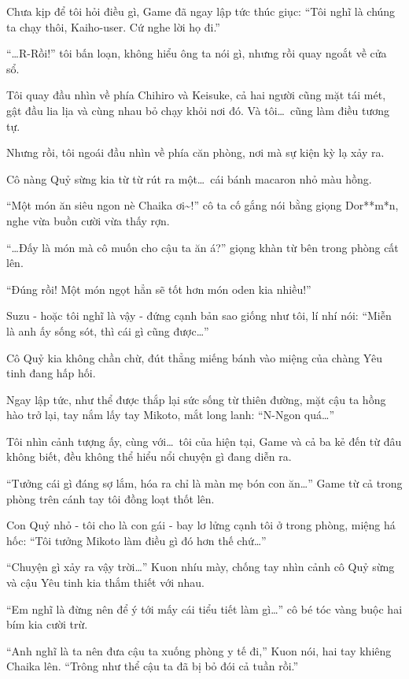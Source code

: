 \documentclass[../main.tex]{subfiles}
\begin{document}
Chưa kịp để tôi hỏi điều gì, Game đã ngay lập tức thúc giục: ``Tôi nghĩ là chúng ta chạy thôi, Kaiho-user. Cứ nghe lời họ đi.''

``\dots R-Rồi!'' tôi bấn loạn, không hiểu ông ta nói gì, nhưng rồi quay ngoắt về cửa sổ.

Tôi quay đầu nhìn về phía Chihiro và Keisuke, cả hai người cũng mặt tái mét, gật đầu lia lịa và cùng nhau bỏ chạy khỏi nơi đó. Và tôi\dots\ cũng làm điều tương tự.

Nhưng rồi, tôi ngoái đầu nhìn về phía căn phòng, nơi mà sự kiện kỳ lạ xảy ra.

Cô nàng Quỷ sừng kia từ từ rút ra một\dots\ cái bánh macaron nhỏ màu hồng.

``Một món ăn siêu ngon nè Chaika ơi\~{}!'' cô ta cố gắng nói bằng giọng Dor**m*n, nghe vừa buồn cười vừa thấy rợn.

``\dots Đấy là món mà cô muốn cho cậu ta ăn á?'' giọng khàn từ bên trong phòng cất lên.

``Đúng rồi! Một món ngọt hẳn sẽ tốt hơn món oden kia nhiều!''

Suzu - hoặc tôi nghĩ là vậy - đứng cạnh bản sao giống như tôi, lí nhí nói: ``Miễn là anh ấy sống sót, thì cái gì cũng được\dots''

Cô Quỷ kia không chần chừ, đút thẳng miếng bánh vào miệng của chàng Yêu tinh đang hấp hối.

Ngay lập tức, như thể được thắp lại sức sống từ thiên đường, mặt cậu ta hồng hào trở lại, tay nắm lấy tay Mikoto, mắt long lanh: ``N-Ngon quá\dots''

Tôi nhìn cảnh tượng ấy, cùng với\dots\ tôi của hiện tại, Game và cả ba kẻ đến từ đâu không biết, đều không thể hiểu nổi chuyện gì đang diễn ra.

``Tưởng cái gì đáng sợ lắm, hóa ra chỉ là màn mẹ bón con ăn\dots'' Game từ cả trong phòng trên cánh tay tôi đồng loạt thốt lên.

Con Quỷ nhỏ - tôi cho là con gái - bay lơ lửng cạnh tôi ở trong phòng, miệng há hốc: ``Tôi tưởng Mikoto làm điều gì đó hơn thế chứ\dots''

``Chuyện gì xảy ra vậy trời\dots'' Kuon nhíu mày, chống tay nhìn cảnh cô Quỷ sừng và cậu Yêu tinh kia thắm thiết với nhau.


``Em nghĩ là đừng nên để ý tới mấy cái tiểu tiết làm gì\dots'' cô bé tóc vàng buộc hai bím kia cười trừ.

``Anh nghĩ là ta nên đưa cậu ta xuống phòng y tế đi,'' Kuon nói, hai tay khiêng Chaika lên. ``Trông như thể cậu ta đã bị bỏ đói cả tuần rồi.''
\end{document}
